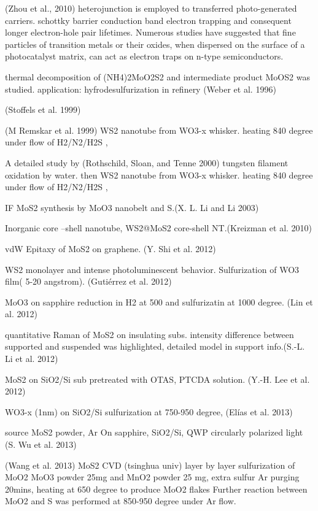 (Zhou et al., 2010) heterojunction is employed to transferred photo-generated carriers. schottky barrier conduction band electron trapping and consequent longer electron-hole pair lifetimes. Numerous studies have suggested that fine particles of transition metals or their oxides, when dispersed on the surface of a photocatalyst matrix, can act as electron traps on n-type semiconductors.

thermal decomposition of (NH4)2MoO2S2 and intermediate product MoOS2 was studied. application: hyfrodesulfurization in refinery (Weber et al. 1996) \cite{Weber1996}

 (Stoffels et al. 1999)


(M Remskar et al. 1999) WS2 nanotube from WO3-x whisker. heating 840 degree under flow of H2/N2/H2S ,

A detailed study by (Rothschild, Sloan, and Tenne 2000) tungsten filament oxidation by water. then WS2 nanotube from WO3-x whisker. heating 840 degree under flow of H2/N2/H2S ,

IF MoS2 synthesis by MoO3 nanobelt and S.(X. L. Li and Li 2003)

Inorganic core –shell nanotube, WS2@MoS2 core-shell NT.(Kreizman et al. 2010)

vdW Epitaxy of MoS2 on graphene. (Y. Shi et al. 2012)

WS2 monolayer and intense photoluminescent behavior. Sulfurization of WO3 film( 5-20 angstrom). (Gutiérrez et al. 2012)

MoO3 on sapphire reduction in H2 at 500 and sulfurizatin at 1000 degree. (Lin et al. 2012)

quantitative Raman of MoS2 on insulating subs. intensity difference between supported and suspended was highlighted, detailed model in support info.(S.-L. Li et al. 2012)

MoS2 on SiO2/Si sub pretreated with OTAS, PTCDA solution. (Y.-H. Lee et al. 2012)

WO3-x (1nm) on SiO2/Si sulfurization at 750-950 degree, (Elías et al. 2013)\cite{Elias2013}

source MoS2 powder, Ar On sapphire, SiO2/Si, QWP circularly polarized  light (S. Wu et al. 2013)

(Wang et al. 2013)
MoS2 CVD (tsinghua univ) layer by layer sulfurization of MoO2
MoO3 powder 25mg and MnO2 powder 25 mg, extra sulfur
Ar purging  20mins, heating at 650 degree to produce MoO2 flakes
Further reaction between MoO2 and S was performed at 850-950 degree under Ar flow.

